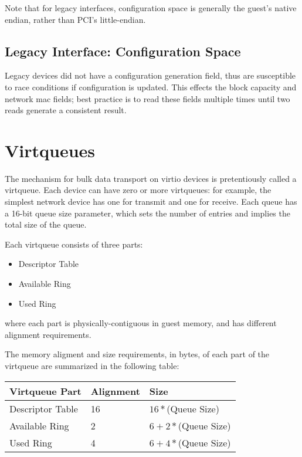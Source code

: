 Note that for legacy interfaces, configuration space is generally the
guest's native endian, rather than PCI's little-endian.

\subsection{Legacy Interface: Configuration Space}\label{sec:Basic Facilities of a Virtio Device / Configuration Space / Legacy Interface: Configuration Space}

Legacy devices did not have a configuration generation field, thus are
susceptible to race conditions if configuration is updated.  This
effects the block capacity and network mac fields; best practice is to
read these fields multiple times until two reads generate a consistent
result.

\section{Virtqueues}\label{sec:Basic Facilities of a Virtio Device / Virtqueues}

The mechanism for bulk data transport on virtio devices is
pretentiously called a virtqueue. Each device can have zero or more
virtqueues: for example, the simplest network device has one for
transmit and one for receive.  Each queue has a 16-bit queue size
parameter, which sets the number of entries and implies the total size
of the queue.

Each virtqueue consists of three parts:

\begin{itemize}
\item Descriptor Table
\item Available Ring
\item Used Ring
\end{itemize}

where each part is physically-contiguous in guest memory,
and has different alignment requirements.

The memory aligment and size requirements, in bytes, of each part of the
virtqueue are summarized in the following table:

\begin{tabular}{|l|l|l|}
\hline
Virtqueue Part    & Alignment & Size \\
\hline \hline
Descriptor Table  & 16        & $16 * $(Queue Size) \\
\hline
Available Ring    & 2         & $6 + 2 * $(Queue Size) \\
 \hline
Used Ring         & 4         & $6 + 4 * $(Queue Size) \\
 \hline
\end{tabular}

